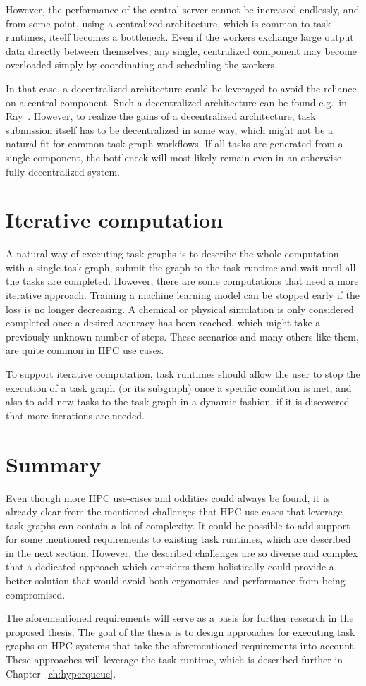 \begin{description}
		However, the performance of the central server cannot be increased endlessly, and from some point,
		using a centralized architecture, which is common to task runtimes, itself becomes a bottleneck.
		Even if the workers exchange large output data directly between themselves, any single, centralized
		component may become overloaded simply by coordinating and scheduling the workers.

		In that case, a decentralized architecture could be leveraged to avoid the reliance on a central
		component. Such a decentralized architecture can be found e.g.\ in Ray~\cite{ray}.
		However, to realize the gains of a decentralized architecture, task submission itself has to be
		decentralized in some way, which might not be a natural fit for common task graph workflows. If all
		tasks are generated from a single component, the bottleneck will most likely remain even in an
		otherwise fully decentralized system.
\end{description}

\section{Iterative computation}
A natural way of executing task graphs is to describe the whole computation with a single task
graph, submit the graph to the task runtime and wait until all the tasks are completed. However,
there are some computations that need a more iterative approach. Training a machine learning model
can be stopped early if the loss is no longer decreasing. A chemical or physical simulation is only
considered completed once a desired accuracy has been reached, which might take a previously
unknown number of steps. These scenarios and many others like them, are quite common in HPC use
cases.

To support iterative computation, task runtimes should allow the user to stop the execution of a
task graph (or its subgraph) once a specific condition is met, and also to add new tasks to the
task graph in a dynamic fashion, if it is discovered that more iterations are needed.

\section{Summary}
Even though more HPC use-cases and oddities could always be found, it is already clear from the
mentioned challenges that HPC use-cases that leverage task graphs can contain a lot of complexity.
It could be possible to add support for some mentioned requirements to existing task runtimes,
which are described in the next section. However, the described challenges are so diverse and
complex that a dedicated approach which considers them holistically could provide a better solution
that would avoid both ergonomics and performance from being compromised.

The aforementioned requirements will serve as a basis for further research in the proposed thesis.
The goal of the thesis is to design approaches for executing task graphs on HPC systems that take
the aforementioned requirements into account. These approaches will leverage the
\hyperqueue{} task runtime, which is described further in
Chapter~\ref{ch:hyperqueue}.
